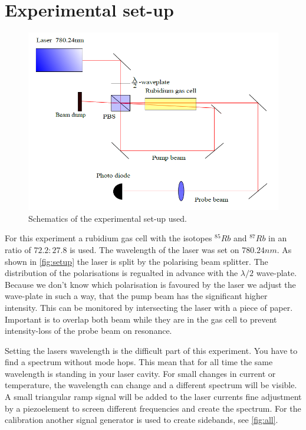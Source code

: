 \documentclass[]{article}
\begin{document}
\section{Experimental set-up}
\begin{figure}[H]
\centering
\includegraphics[width=1\textwidth]{Plots/Setup.png}
\caption{Schematics of the experimental set-up used.}
\label{fig:setup}
\end{figure}

For this experiment a rubidium gas cell with the isotopes $^{85}Rb$ and $^{87}Rb$ in an ratio of $72.2 : 27.8$ is used. The wavelength of the laser was set on $780.24nm$. As shown in \autoref{fig:setup} the laser is split by the polarising beam splitter. The distribution of the polarisations is regualted in advance with the $\lambda/2$ wave-plate. Because we don't know which polarisation is favoured by the laser we adjust the wave-plate in such a way, that the pump beam has the significant higher intensity. This can be monitored by intersecting the laser with a piece of paper. Important is to overlap both beam while they are in the gas cell to prevent intensity-loss of the probe beam on resonance.

Setting the lasers wavelength is the difficult part of this experiment. You have to find a spectrum without mode hops. This mean that for all time the same wavelength is standing in your laser cavity. For small changes in current or temperature, the wavelength can change and a different spectrum will be visible. A small triangular ramp signal will be added to the laser currents fine adjustment by a piezoelement to screen different frequencies and create the spectrum. For the calibration another signal generator is used to create sidebands, see \autoref{fig:all}.
\end{document}
